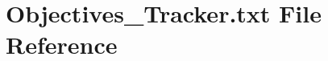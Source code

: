 \hypertarget{Objectives__Tracker_8txt}{}\section{Objectives\+\_\+\+Tracker.\+txt File Reference}
\label{Objectives__Tracker_8txt}

